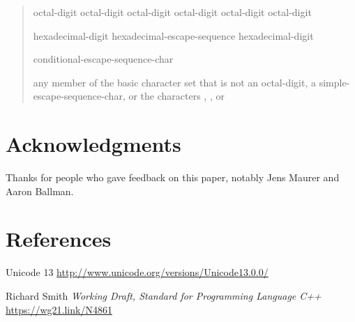 \documentclass{wg21}
\begin{document}
\begin{quote}
    \begin{bnf}
        \br
        \terminal{\textbackslash} octal-digit\br
        \terminal{\textbackslash} octal-digit octal-digit\br
        \terminal{\textbackslash} octal-digit octal-digit octal-digit\br
    \end{bnf}
    
    \begin{bnf}
        \br
         hexadecimal-digit\br
        hexadecimal-escape-sequence hexadecimal-digit\br
    \end{bnf}
    
    \begin{bnf}
        \br
        \terminal{\textbackslash} conditional-escape-sequence-char
    \end{bnf}
    \begin{bnf}
        \br
        \textnormal{any member of the basic character set that is not an} octal-digit\textnormal{, a} simple-escape-sequence-char\textnormal{, or the characters  , , or }
    \end{bnf}
    
\end{quote}

\section{Acknowledgments}

Thanks for people who gave feedback on this paper, notably Jens Maurer and Aaron Ballman.

\section{References}
\renewcommand{\section}[2]{}%



\begin{thebibliography}{9}
    
    
    Unicode 13\newline
    \url{http://www.unicode.org/versions/Unicode13.0.0/}
    
    
    Richard Smith
    \emph{Working Draft, Standard for Programming Language C++}\newline
    \url{https://wg21.link/N4861}
    
\end{thebibliography}
\end{document}
